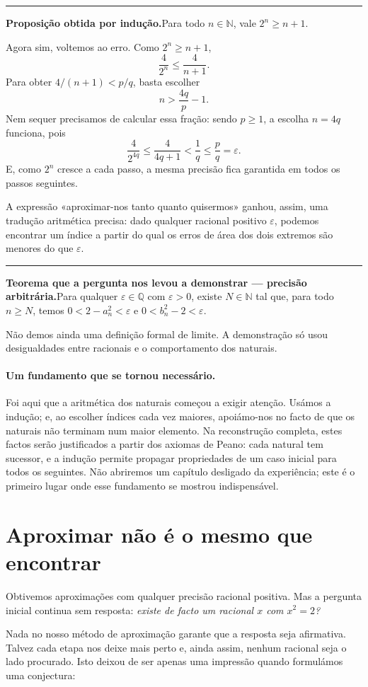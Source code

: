 \documentclass[11pt,a4paper]{article}
\newcommand{\Q}{\mathbb{Q}}
\newcommand{\N}{\mathbb{N}}
\newcommand{\assentado}[2]{%
\par\medskip\noindent\begingroup\color{azul}\rule{\linewidth}{0.45pt}\par\smallskip
\noindent\textbf{#1.}\enspace #2\par\endgroup\medskip}
\begin{document}
\assentado{Proposição obtida por indução}{Para todo $n\in\N$, vale $2^n\ge n+1$.}

Agora sim, voltemos ao erro. Como $2^n\ge n+1$,
\[
\frac4{2^n}\le\frac4{n+1}.
\]
Para obter $4/(n+1)<p/q$, basta escolher
\[
n>\frac{4q}{p}-1.
\]
Nem sequer precisamos de calcular essa fração: sendo $p\ge1$, a escolha $n=4q$ funciona, pois
\[
\frac4{2^{4q}}\le\frac4{4q+1}<\frac1q\le\frac pq=\varepsilon.
\]
E, como $2^n$ cresce a cada passo, a mesma precisão fica garantida em todos os passos seguintes.

A expressão «aproximar-nos tanto quanto quisermos» ganhou, assim, uma tradução aritmética precisa: dado qualquer racional positivo $\varepsilon$, podemos encontrar um índice a partir do qual os erros de área dos dois extremos são menores do que $\varepsilon$.

\assentado{Teorema que a pergunta nos levou a demonstrar --- precisão arbitrária}{Para qualquer $\varepsilon\in\Q$ com $\varepsilon>0$, existe $N\in\N$ tal que, para todo $n\ge N$, temos $0<2-a_n^2<\varepsilon$ e $0<b_n^2-2<\varepsilon$.}

Não demos ainda uma definição formal de limite. A demonstração só usou desigualdades entre racionais e o comportamento dos naturais.

\paragraph{Um fundamento que se tornou necessário.}
Foi aqui que a aritmética dos naturais começou a exigir atenção. Usámos a indução; e, ao escolher índices cada vez maiores, apoiámo-nos no facto de que os naturais não terminam num maior elemento. Na reconstrução completa, estes factos serão justificados a partir dos axiomas de Peano: cada natural tem sucessor, e a indução permite propagar propriedades de um caso inicial para todos os seguintes. Não abriremos um capítulo desligado da experiência; este é o primeiro lugar onde esse fundamento se mostrou indispensável.

\section{Aproximar não é o mesmo que encontrar}

Obtivemos aproximações com qualquer precisão racional positiva. Mas a pergunta inicial continua sem resposta: \emph{existe de facto um racional $x$ com $x^2=2$?}

Nada no nosso método de aproximação garante que a resposta seja afirmativa. Talvez cada etapa nos deixe mais perto e, ainda assim, nenhum racional seja o lado procurado. Isto deixou de ser apenas uma impressão quando formulámos uma conjectura:
\end{document}
